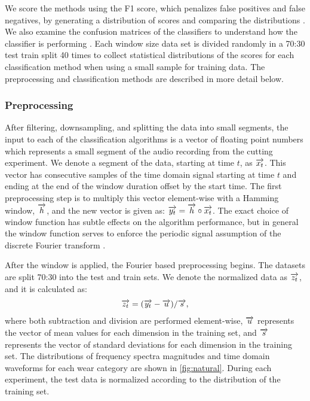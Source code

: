 We score the methods using the F1 score, which penalizes false positives and false negatives,
by generating a distribution of scores and comparing the distributions \cite{Goutte2005}.
We also examine the confusion matrices of the classifiers to understand 
how the classifier is performing \cite{Bramer2007}.
Each window size data set is divided randomly in a 70:30 test train split 40 times 
to collect statistical distributions of the scores for each classification method 
when using a small sample for training data.
The preprocessing and classification methods are described in more detail below.

\subsubsection{Preprocessing}

After filtering, downsampling, and splitting the data into small segments,
the input to each of the classification algorithms is a vector of floating point numbers 
which represents a small segment of the audio recording from the cutting experiment. 
We denote a segment of the data, starting at time $t$, as $\overrightarrow{x_t}$.
This vector has consecutive samples of the time domain signal starting at time $t$ and 
ending at the end of the window duration offset by the start time.
The first preprocessing step is to multiply this vector element-wise with a Hamming window, $\overrightarrow{h}$, and
the new vector is given as: $\overrightarrow{y_t} = \overrightarrow{h} \circ \overrightarrow{x_t}$.
The exact choice of window function has subtle effects on the algorithm performance, 
but in general the window function serves to enforce the periodic signal assumption of the 
discrete Fourier transform \cite{Harris1978}. 

After the window is applied, the Fourier based preprocessing begins.
The datasets are split 70:30 into the test and train sets. 
We denote the normalized data as $\overrightarrow{z_t}$, and it is calculated as:
\begin{align}
\overrightarrow{z_t} = (\overrightarrow{y_t} - \overrightarrow{u}) / \overrightarrow{s},
\end{align}
where both subtraction and division are performed element-wise, $\overrightarrow{u}$ represents the vector
of mean values for each dimension in the training set, 
and $\overrightarrow{s}$ represents the vector of standard deviations for each
dimension in the training set. 
The distributions of frequency spectra magnitudes and time domain waveforms
for each wear category are shown in \ref{fig:natural}.
During each experiment, the test data is normalized according to the distribution of the training set.

